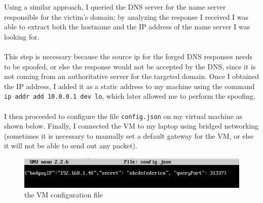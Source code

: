 \documentclass[a4paper]{article}
\begin{document}
	\newpage
	Using a similar approach, I queried the DNS server for the name server responsible for the victim's domain; by analyzing the response I received I was able to extract both the hostname and the IP address of the name server I was looking for.\\
	\\This step is necessary because the source ip for the forged DNS responses needs to be spoofed, or else the response would not be accepted by the DNS, since it is not coming from an authoritative server for the targeted domain.
	Once I obtained the IP address, I added it as a static address to my machine using the command \texttt{ip addr add 10.0.0.1 dev lo}, which later allowed me to perform the spoofing.
	\\\\I then proceeded to configure the file \texttt{config.json} on my virtual machine as shown below. Finally, I connected the VM to my laptop using bridged networking (sometimes it is necessary to manually set a default gateway for the VM, or else it will not be able to send out any packet).\\
	\begin{figure}[H]
		\centering
		\includegraphics[width=1\linewidth]{config_json}
		\caption{the VM configuration file}
		\label{fig:configjson}
	\end{figure}
	
\end{document}
